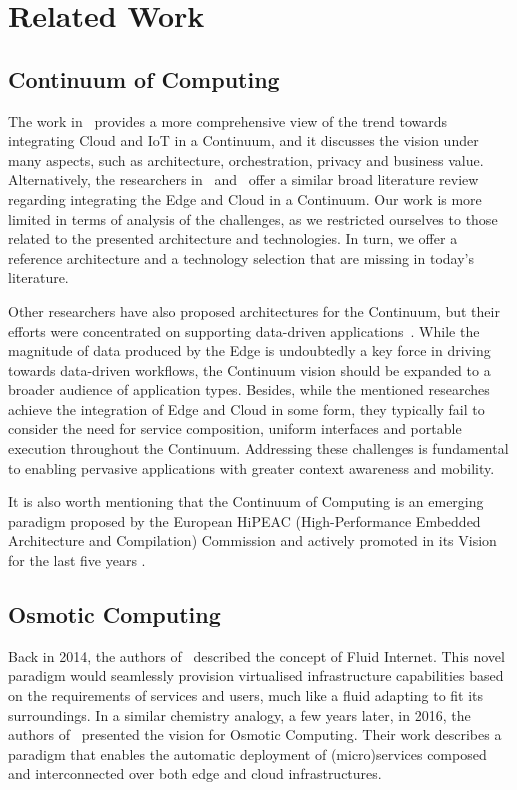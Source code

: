 \section{Related Work}

\subsection{Continuum of Computing}

The work in~\cite{lynn2020cloud} provides a more comprehensive view of the trend towards integrating Cloud and IoT in a Continuum, and it discusses the vision under many aspects, such as architecture, orchestration, privacy and business value. Alternatively, the researchers in~\cite{santos2021towards} and~\cite{BITTENCOURT2018134} offer a similar broad literature review regarding integrating the Edge and Cloud in a Continuum. Our work is more limited in terms of analysis of the challenges, as we restricted ourselves to those related to the presented architecture and technologies. In turn, we offer a reference architecture and a technology selection that are missing in today's literature.

Other researchers have also proposed architectures for the Continuum, but their efforts were concentrated on supporting data-driven applications~\cite{risco2021serverless, balouek2019towards, abdelbaky2017computing}. While the magnitude of data produced by the Edge is undoubtedly a key force in driving towards data-driven workflows, the Continuum vision should be expanded to a broader audience of application types. Besides, while the mentioned researches achieve the integration of Edge and Cloud in some form, they typically fail to consider the need for service composition, uniform interfaces and portable execution throughout the Continuum. Addressing these challenges is fundamental to enabling pervasive applications with greater context awareness and mobility.

It is also worth mentioning that the Continuum of Computing is an emerging paradigm proposed by the European HiPEAC (High-Performance Embedded Architecture and Compilation) Commission and actively promoted in its Vision for the last five years \cite{hipeac}.

\subsection{Osmotic Computing}

Back in 2014, the authors of~\cite{latre2014fluid} described the concept of Fluid Internet. This novel paradigm would seamlessly provision virtualised infrastructure capabilities based on the requirements of services and users, much like a fluid adapting to fit its surroundings. In a similar chemistry analogy, a few years later, in 2016, the authors of~\cite{villari2016osmotic} presented the vision for Osmotic Computing. Their work describes a paradigm that enables the automatic deployment of (micro)services composed and interconnected over both edge and cloud infrastructures.


